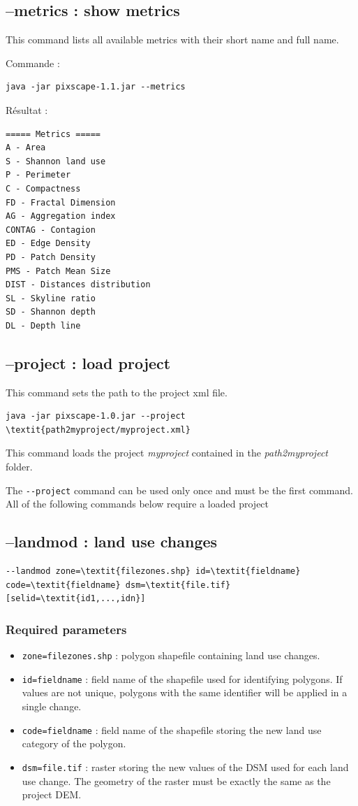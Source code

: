 \documentclass{report}
\begin{document}
\subsection{--metrics : show metrics}
This command lists all available metrics with their short name and full name.

Commande :
\begin{Verbatim}
java -jar pixscape-1.1.jar --metrics
\end{Verbatim}
Résultat :
\begin{Verbatim}
===== Metrics =====
A - Area
S - Shannon land use
P - Perimeter
C - Compactness
FD - Fractal Dimension
AG - Aggregation index
CONTAG - Contagion
ED - Edge Density
PD - Patch Density
PMS - Patch Mean Size
DIST - Distances distribution
SL - Skyline ratio
SD - Shannon depth
DL - Depth line
\end{Verbatim}

\subsection{--project : load project}
This command sets the path to the project xml file.
\begin{Verbatim}[commandchars=\\\{\}]
java -jar pixscape-1.0.jar --project \textit{path2myproject/myproject.xml}
\end{Verbatim}
This command loads the project \textit{myproject} contained in the \textit{path2myproject} folder.

The \verb|--project| command can be used only once and must be the first command.  All of the following commands below require a loaded project

\subsection{--landmod : land use changes}

\begin{Verbatim}[commandchars=\\\{\}]
--landmod zone=\textit{filezones.shp} id=\textit{fieldname} code=\textit{fieldname} dsm=\textit{file.tif} [selid=\textit{id1,...,idn}]
\end{Verbatim}

\subsubsection{Required parameters}
\begin{itemize}
	\item \verb|zone=filezones.shp| : polygon shapefile containing land use changes.
	\item \verb|id=fieldname| : field name of the shapefile used for identifying polygons. If values are not unique, polygons with the same identifier will be applied in a single change.
	\item \verb|code=fieldname| : field name of the shapefile storing the new land use category of the polygon.
	\item \verb|dsm=file.tif| : raster storing the new values of the DSM used for each land use change. The geometry of the raster must be exactly the same as the project DEM.
\end{itemize}
\end{document}
